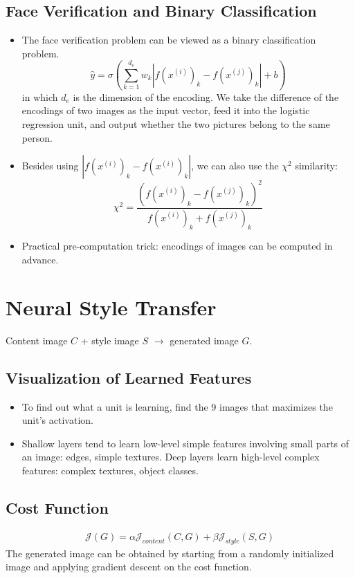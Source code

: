 \subsection{Face Verification and Binary Classification}
\begin{itemize}
  \item The face verification problem can be viewed as a binary classification problem. 
  \[\hat{y}=\sigma\left(\displaystyle\sum_{k=1}^{d_e}w_k\left\vert f\left(x^{(i)}\right)_k-f\left(x^{(j)}\right)_k\right\vert+b\right)\]
  in which $d_e$ is the dimension of the encoding. We take the difference of the encodings of two images as the input vector, feed it into the logistic regression unit, and output whether the two pictures belong to the same person.
  \item Besides using $\left\vert f\left(x^{(i)}\right)_k-f\left(x^{(i)}\right)_k\right\vert$, we can also use the $\chi^2$ similarity:
  \[\chi^2=\frac{\left(f\left(x^{(i)}\right)_k-f\left(x^{(j)}\right)_k\right)^2}{f\left(x^{(i)}\right)_k+f\left(x^{(j)}\right)_k}\]
  \item Practical pre-computation trick: encodings of images can be computed in advance.
\end{itemize}
\section{Neural Style Transfer}
Content image $C$ + style image $S$ $\rightarrow$ generated image $G$.
\subsection{Visualization of Learned Features}
\begin{itemize}
  \item To find out what a unit is learning, find the 9 images that maximizes the unit's activation. 
  \item Shallow layers tend to learn low-level simple features involving small parts of an image: edges, simple textures. Deep layers learn high-level complex features: complex textures, object classes.
\end{itemize}
\subsection{Cost Function}
\begin{align*}
  \mathcal{J}(G)=\alpha\mathcal{J}_{content}(C,G)+\beta\mathcal{J}_{style}(S,G)
\end{align*}
The generated image can be obtained by starting from a randomly initialized image and applying gradient descent on the cost function.
